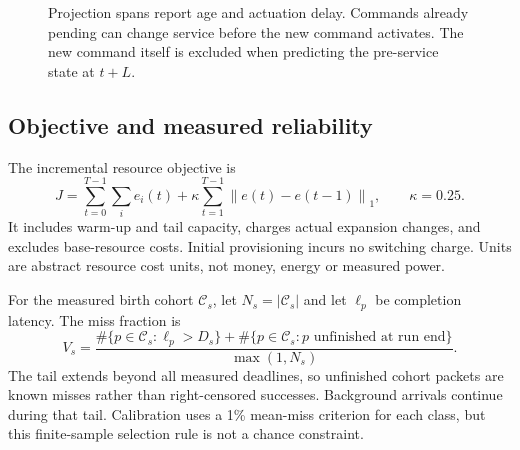 \documentclass[10pt,a4paper]{article}
\newcommand{\norm}[1]{\left\lVert#1\right\rVert_1}
\begin{document}
\begin{figure}[htbp]\centering
{}
\caption{Projection spans report age and actuation delay. Commands already pending
can change service before the new command activates. The new command itself is
excluded when predicting the pre-service state at $t+L$.}
\label{fig:timeline}
\end{figure}

\subsection{Objective and measured reliability}
The incremental resource objective is
\begin{equation}
 J=\sum_{t=0}^{T-1}\sum_i e_i(t)
 +\kappa\sum_{t=1}^{T-1}\norm{e(t)-e(t-1)},\qquad\kappa=0.25.\label{eq:cost}
\end{equation}
It includes warm-up and tail capacity, charges actual expansion changes, and
excludes base-resource costs. Initial provisioning incurs no switching charge.
Units are abstract resource cost units, not money, energy or measured power.

For the measured birth cohort $\mathcal C_s$, let $N_s=|\mathcal C_s|$ and let
$\ell_p$ be completion latency. The miss fraction is
\begin{equation}
 V_s=\frac{\#\{p\in\mathcal C_s:\ell_p>D_s\}
 +\#\{p\in\mathcal C_s:p\text{ unfinished at run end}\}}{\max(1,N_s)}.\label{eq:miss}
\end{equation}
The tail extends beyond all measured deadlines, so unfinished cohort packets
are known misses rather than right-censored successes. Background arrivals
continue during that tail. Calibration uses a 1\% mean-miss criterion for each
class, but this finite-sample selection rule is not a chance constraint.
\end{document}
